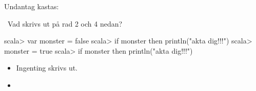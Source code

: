 \Subtask {}

\Subtask {}

\Subtask {}


\Subtask {}

\Subtask {}

\Subtask {}


\Subtask {}

\Subtask {}

\Subtask {}

\SOLUTION

\TaskSolved \what

\SubtaskSolved {}

\SubtaskSolved {}

\SubtaskSolved {}

\SubtaskSolved {}


\SubtaskSolved {}

\SubtaskSolved {}

\SubtaskSolved {}


\SubtaskSolved {}

\SubtaskSolved Undantag kastas: 

\SubtaskSolved {}

\QUESTEND






\QUESTBEGIN

\Task \what~Vad skrivs ut på rad 2 och 4 nedan?

\begin{REPL}
scala> var monster = false
scala> if monster then println("akta dig!!!")
scala> monster = true
scala> if monster then println("akta dig!!!")
\end{REPL}

\SOLUTION

\TaskSolved \what

\begin{itemize}
\item[2:] Ingenting skrivs ut.
\item[4:] 
\end{itemize}


\QUESTEND






